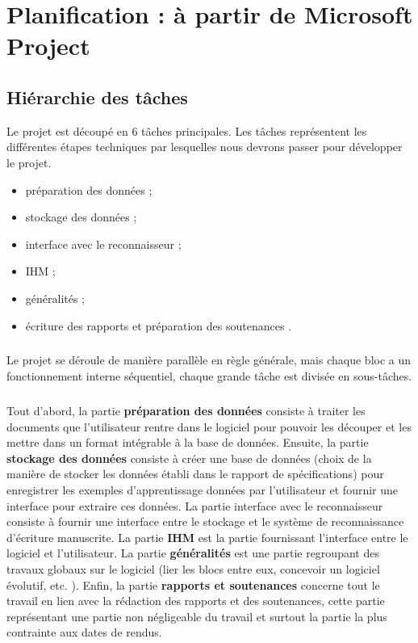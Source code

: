 
\chapter{Planification : à partir de Microsoft Project}

\section{Hiérarchie des tâches}

Le projet est découpé en 6 tâches principales. Les tâches représentent les différentes
étapes techniques par lesquelles nous devrons passer pour développer le projet.

\begin{itemize}
\item préparation des données ;
\item stockage des données ;
\item interface avec le reconnaisseur ;
\item IHM ;
\item généralités ;
\item écriture des rapports et préparation des soutenances .
\end{itemize}

\paragraph{}

Le projet se déroule de manière parallèle en règle générale, mais chaque bloc a un fonctionnement interne séquentiel, chaque grande tâche est divisée en sous-tâches.

\paragraph{}

Tout d’abord, la partie \textbf{préparation des données} consiste à traiter les documents que l’utilisateur rentre dans le logiciel pour pouvoir les découper et les mettre dans un format intégrable à la base de données.
Ensuite, la partie \textbf{stockage des données} consiste à créer une base de données (choix de la manière de stocker les données établi dans le rapport de spécifications) pour enregistrer les exemples d’apprentissage données par l’utilisateur et fournir une interface pour extraire ces données.
La partie interface avec le reconnaisseur consiste à fournir une interface entre le stockage et le système de reconnaissance d’écriture manuscrite.
La partie \textbf{IHM} est la partie fournissant l’interface entre le logiciel et l’utilisateur.
La partie \textbf{généralités} est une partie regroupant des travaux globaux sur le logiciel (lier les blocs entre eux, concevoir un logiciel évolutif, etc. ).
Enfin,  la partie \textbf{rapports et soutenances} concerne tout le travail en lien avec la rédaction des rapports et des soutenances, cette partie représentant une partie non négligeable du travail et surtout la partie la plus contrainte aux dates de rendus.

